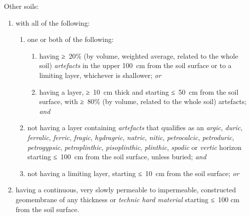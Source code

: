 \documentclass[
  letterpaper,
  DIV=11,
  numbers=noendperiod]{scrreprt}
\providecommand{\tightlist}{%
  \setlength{\itemsep}{0pt}\setlength{\parskip}{0pt}}\usepackage{longtable,booktabs,array}
\begin{document}
Other soils:

\begin{enumerate}
\def\labelenumi{\arabic{enumi}.}
\tightlist
\item
  with all of the following:

  \begin{enumerate}
  \def\labelenumii{\alph{enumii}.}
  \tightlist
  \item
    one or both of the following:

    \begin{enumerate}
    \def\labelenumiii{\roman{enumiii}.}
    \tightlist
    \item
      having ≥~20\% (by volume, weighted average, related to the whole
      soil) \emph{artefacts} in the upper 100~cm from the soil surface
      or to a limiting layer, whichever is shallower; \emph{or}
    \item
      having a layer, ≥~10~cm thick and starting ≤~50~cm from the soil
      surface, with ≥~80\% (by volume, related to the whole soil)
      artefacts; \emph{and}
    \end{enumerate}
  \item
    not having a layer containing \emph{artefacts} that qualifies as an
    \emph{argic}, \emph{duric}, \emph{ferralic}, \emph{ferric},
    \emph{fragic}, \emph{hydragric}, \emph{natric}, \emph{nitic},
    \emph{petrocalcic}, \emph{petroduric}, \emph{petrogypsic},
    \emph{petroplinthic}, \emph{pisoplinthic}, \emph{plinthic},
    \emph{spodic} or \emph{vertic} horizon starting ≤~100~cm from the
    soil surface, unless buried; \emph{and}
  \item
    not having a limiting layer, starting ≤~10~cm from the soil surface;
    \emph{or}
  \end{enumerate}
\item
  having a continuous, very slowly permeable to impermeable, constructed
  geomembrane of any thickness or \emph{technic hard material} starting
  ≤~100 cm from the soil surface.
\end{enumerate}
\end{document}
